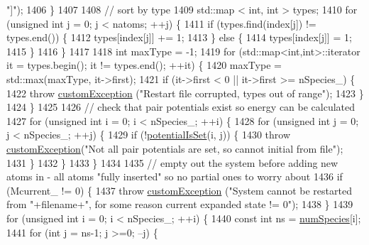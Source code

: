 \begin{DoxyCode}
{      "]"});
1406     \}
1407 
1408     \textcolor{comment}{// sort by type}
1409     std::map < int, int > types;
1410     \textcolor{keywordflow}{for} (\textcolor{keywordtype}{unsigned} \textcolor{keywordtype}{int} j = 0; j < natoms; ++j) \{
1411         \textcolor{keywordflow}{if} (types.find(index[j]) != types.end()) \{
1412             types[index[j]] += 1;
1413         \} \textcolor{keywordflow}{else} \{
1414             types[index[j]] = 1;
1415         \}
1416     \}
1417 
1418     \textcolor{keywordtype}{int} maxType = -1;
1419     \textcolor{keywordflow}{for} (std::map<int,int>::iterator it = types.begin(); it != types.end(); ++it) \{
1420         maxType = std::max(maxType, it->first);
1421         \textcolor{keywordflow}{if} (it->first < 0 || it->first >= nSpecies\_) \{
1422             \textcolor{keywordflow}{throw} \hyperlink{classcustom_exception}{customException} (\textcolor{stringliteral}{"Restart file corrupted, types out of range"});
1423         \}
1424     \}
1425 
1426     \textcolor{comment}{// check that pair potentials exist so energy can be calculated}
1427     \textcolor{keywordflow}{for} (\textcolor{keywordtype}{unsigned} \textcolor{keywordtype}{int} i = 0; i < nSpecies\_; ++i) \{
1428         \textcolor{keywordflow}{for} (\textcolor{keywordtype}{unsigned} \textcolor{keywordtype}{int} j = 0; j < nSpecies\_; ++j) \{
1429             \textcolor{keywordflow}{if} (!\hyperlink{classsim_system_a40af191fae6091e26413ee06ae188ae9}{potentialIsSet}(i, j)) \{
1430                 \textcolor{keywordflow}{throw} \hyperlink{classcustom_exception}{customException}(\textcolor{stringliteral}{"Not all pair potentials are set, so cannot initial
       from file"});
1431             \}
1432         \}
1433     \}
1434 
1435     \textcolor{comment}{// empty out the system before adding new atoms in - all atoms "fully inserted" so no partial ones to
       worry about}
1436     \textcolor{keywordflow}{if} (Mcurrent\_ != 0) \{
1437         \textcolor{keywordflow}{throw} \hyperlink{classcustom_exception}{customException} (\textcolor{stringliteral}{"System cannot be restarted from "}+filename+\textcolor{stringliteral}{", for some
       reason current expanded state != 0"});
1438     \}
1439     \textcolor{keywordflow}{for} (\textcolor{keywordtype}{unsigned} \textcolor{keywordtype}{int} i = 0; i < nSpecies\_; ++i) \{
1440         \textcolor{keyword}{const} \textcolor{keywordtype}{int} ns = \hyperlink{classsim_system_a9eea865e6dc1cff377b1e79c4d9c23f0}{numSpecies}[i];
1441         \textcolor{keywordflow}{for} (\textcolor{keywordtype}{int} j = ns-1; j >=0; --j) \{

\end{DoxyCode}
